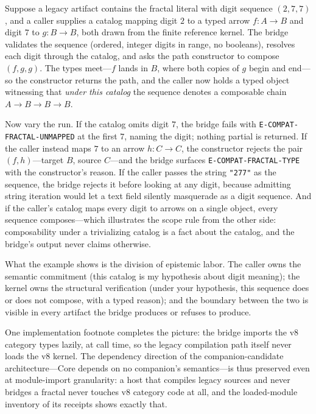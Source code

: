 \begin{example}\label{ch08:ex:bridge}
Suppose a legacy artifact contains the fractal literal with digit sequence $(2, 7, 7)$, and a caller supplies a catalog mapping digit $2$ to a typed arrow $f : A \to B$ and digit $7$ to $g : B \to B$, both drawn from the finite reference kernel. The bridge validates the sequence (ordered, integer digits in range, no booleans), resolves each digit through the catalog, and asks the path constructor to compose $(f, g, g)$. The types meet---$f$ lands in $B$, where both copies of $g$ begin and end---so the constructor returns the path, and the caller now holds a typed object witnessing that \emph{under this catalog} the sequence denotes a composable chain $A \to B \to B \to B$.

Now vary the run. If the catalog omits digit $7$, the bridge fails with \texttt{E-COMPAT-FRACTAL-UNMAPPED} at the first $7$, naming the digit; nothing partial is returned. If the caller instead maps $7$ to an arrow $h : C \to C$, the constructor rejects the pair $(f, h)$---target $B$, source $C$---and the bridge surfaces \texttt{E-COMPAT-FRACTAL-TYPE} with the constructor's reason. If the caller passes the string \texttt{"277"} as the sequence, the bridge rejects it before looking at any digit, because admitting string iteration would let a text field silently masquerade as a digit sequence. And if the caller's catalog maps every digit to arrows on a single object, every sequence composes---which illustrates the scope rule from the other side: composability under a trivializing catalog is a fact about the catalog, and the bridge's output never claims otherwise.

What the example shows is the division of epistemic labor. The caller owns the semantic commitment (this catalog is my hypothesis about digit meaning); the kernel owns the structural verification (under your hypothesis, this sequence does or does not compose, with a typed reason); and the boundary between the two is visible in every artifact the bridge produces or refuses to produce.
\end{example}

One implementation footnote completes the picture: the bridge imports the v8 category types lazily, at call time, so the legacy compilation path itself never loads the v8 kernel. The dependency direction of the companion-candidate architecture---Core depends on no companion's semantics---is thus preserved even at module-import granularity: a host that compiles legacy sources and never bridges a fractal never touches v8 category code at all, and the loaded-module inventory of its receipts shows exactly that.

